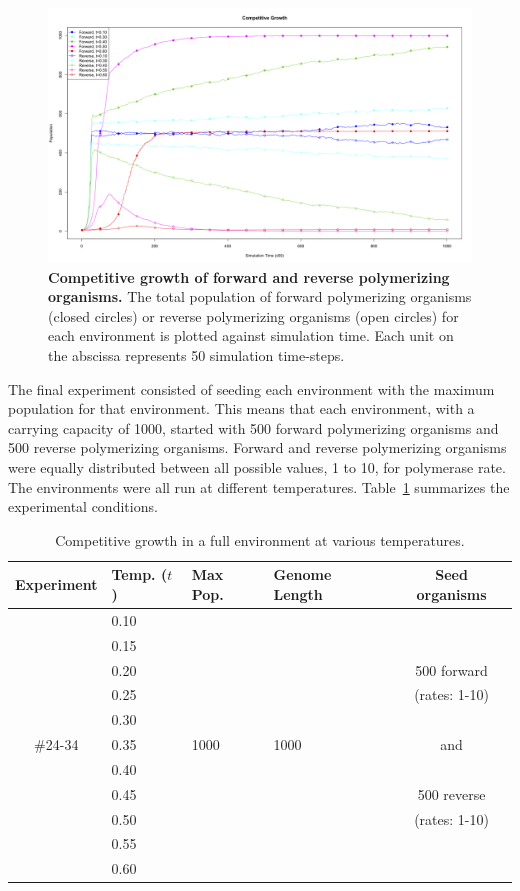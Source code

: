 \begin{figure}[h]
	\centering
		\includegraphics[width=\textwidth]{cluster_growth_num}
	\caption{\textbf{Competitive growth of forward and reverse polymerizing organisms.} The total population of forward polymerizing organisms (closed circles) or reverse polymerizing organisms (open circles) for each environment is plotted against simulation time. Each unit on the abscissa represents 50 simulation time-steps.}
	\label{fig:cluster_growth_num}
\end{figure}

The final experiment consisted of seeding each environment with the maximum population for that environment. This means that each environment, with a carrying capacity of 1000, started with 500 forward polymerizing organisms and 500 reverse polymerizing organisms. Forward and reverse polymerizing organisms were equally distributed between all possible values, 1 to 10, for polymerase rate. The environments were all run at different temperatures. Table~\ref{tab:strict} summarizes the experimental conditions.

\begin{table}
	\begin{center}
		\begin{tabular}[c]{ c | l | l | l | c }
			Experiment & Temp. ($t$) & Max Pop. & Genome Length & Seed organisms \\
			\hline
			& 0.10 & & &\\
			& 0.15 & & &\\
			& 0.20 & & & 500 forward\\
			& 0.25 & & & (rates: 1-10)\\
			& 0.30 & & &\\
			\#24-34 & 0.35 & 1000 & 1000 & and\\
			& 0.40 & & &\\
			& 0.45 & & & 500 reverse\\
			& 0.50 & & & (rates: 1-10)\\
			& 0.55 & & &\\
			& 0.60 & & &\\
		\end{tabular}
		\caption{Competitive growth in a full environment at various temperatures.}
		\label{tab:strict}
	\end{center}
\end{table}

